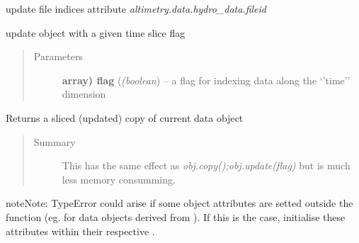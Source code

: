 \documentclass[letterpaper,10pt,english]{sphinxmanual}
\begin{document}
\begin{fulllineitems}

\begin{fulllineitems}
\label{altimetry.data:altimetry.data.hydro_data.update_fid_list}
update file indices attribute \emph{altimetry.data.hydro\_data.fileid}

\end{fulllineitems}


\begin{fulllineitems}
\label{altimetry.data:altimetry.data.hydro_data.update_with_slice}
update object with a given time slice flag
\begin{quote}\begin{description}
\item[{Parameters}] \leavevmode
\textbf{array) flag} (\emph{(boolean}) -- a flag for indexing data along the `'time'' dimension

\end{description}\end{quote}

\end{fulllineitems}


\begin{fulllineitems}
\label{altimetry.data:altimetry.data.hydro_data.updated_copy}
Returns a sliced (updated) copy of current data object
\begin{quote}\begin{description}
\item[{Summary }] \leavevmode
This has the same effect as \emph{obj.copy();obj.update(flag)} but is much less memory consumming.

\end{description}\end{quote}

\begin{notice}{note}{Note:}
TypeError could arise if some object attributes are setted outside the  function (eg. for data objects derived from ). If this is the case, initialise these attributes within their respective .
\end{notice}


\end{fulllineitems}
\end{fulllineitems}
\end{document}
